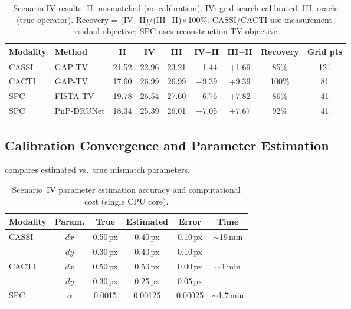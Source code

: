 \documentclass[runningheads]{llncs}
\begin{document}
\begin{table}[h]
\centering
\caption{Scenario IV results. II: mismatched (no calibration). IV: grid-search calibrated. III: oracle (true operator). Recovery = (IV$-$II)/(III$-$II)$\times$100\%. CASSI/CACTI use measurement-residual objective; SPC uses reconstruction-TV objective.}
\label{tab:scenario_iv_perscene}
\begin{tabular}{@{}llccccccc@{}}
\toprule
\textbf{Modality} & \textbf{Method} & \textbf{II} & \textbf{IV} & \textbf{III} & \textbf{IV$-$II} & \textbf{III$-$II} & \textbf{Recovery} & \textbf{Grid pts} \\
\midrule
CASSI & GAP-TV     & 21.52 & 22.96 & 23.21 & +1.44 & +1.69 & 85\% & 121 \\
CACTI & GAP-TV     & 17.60 & 26.99 & 26.99 & +9.39 & +9.39 & 100\% & 81 \\
SPC   & FISTA-TV   & 19.78 & 26.54 & 27.60 & +6.76 & +7.82 & 86\% & 41 \\
SPC   & PnP-DRUNet & 18.34 & 25.39 & 26.01 & +7.05 & +7.67 & 92\% & 41 \\
\bottomrule
\end{tabular}
\end{table}

\subsection{Calibration Convergence and Parameter Estimation}

 compares estimated vs.\ true mismatch parameters.

\begin{table}[h]
\centering
\caption{Scenario~IV parameter estimation accuracy and computational cost (single CPU core).}
\label{tab:scenario_iv_params}
\begin{tabular}{@{}lccccc@{}}
\toprule
\textbf{Modality} & \textbf{Param.} & \textbf{True} & \textbf{Estimated} & \textbf{Error} & \textbf{Time} \\
\midrule
\multirow{2}{*}{CASSI} & $dx$ & 0.50\,px & 0.40\,px & 0.10\,px & \multirow{2}{*}{$\sim$19\,min} \\
 & $dy$ & 0.30\,px & 0.40\,px & 0.10\,px & \\
\midrule
\multirow{2}{*}{CACTI} & $dx$ & 0.50\,px & 0.50\,px & 0.00\,px & \multirow{2}{*}{$\sim$1\,min} \\
 & $dy$ & 0.30\,px & 0.25\,px & 0.05\,px & \\
\midrule
SPC & $\alpha$ & 0.0015 & 0.00125 & 0.00025 & $\sim$1.7\,min \\
\bottomrule
\end{tabular}
\end{table}
\end{document}
